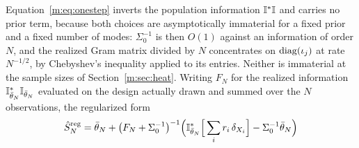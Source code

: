 \begin{remark}\label{m:rem:reg}
Equation~\eqref{m:eq:onestep} inverts the population information $\mathbb{I}^*\mathbb{I}$ and carries no prior term, because both choices are asymptotically immaterial for a fixed prior and a fixed number of modes: $\Sigma_0^{-1}$ is then $O(1)$ against an information of order $N$, and the realized Gram matrix divided by $N$ concentrates on $\operatorname{diag}(\iota_j)$ at rate $N^{-1/2}$, by Chebyshev's inequality applied to its entries. Neither is immaterial at the sample sizes of Section~\ref{m:sec:heat}. Writing $F_N$ for the realized information $\mathbb{I}^*_{\bar\theta_N}\mathbb{I}_{\bar\theta_N}$ evaluated on the design actually drawn and summed over the $N$ observations, the regularized form
\begin{equation}\label{m:eq:regsummary}
\hat S^{\rm reg}_N=\bar\theta_N+\big(F_N+\Sigma_0^{-1}\big)^{-1}\Big(\mathbb{I}^*_{\bar\theta_N}\Big[\sum_ir_i\,\delta_{X_i}\Big]-\Sigma_0^{-1}\bar\theta_N\Big)
\end{equation}

\end{remark}
